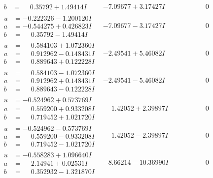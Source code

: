 \documentclass[1p]{elsarticle_modified}
\theoremstyle{definition}
\begin{document}
$$\begin{array}{c|c|c}
\begin{aligned}
b &= \phantom{-}0.35792 + 1.49414 I\end{aligned}
 & -7.09677 + 3.17427 I & \phantom{-0.000000 } 0 \\ \hline\begin{aligned}
u &= -0.222326 - 1.200120 I \\
a &= -0.544275 + 0.426823 I \\
b &= \phantom{-}0.35792 - 1.49414 I\end{aligned}
 & -7.09677 - 3.17427 I & \phantom{-0.000000 } 0 \\ \hline\begin{aligned}
u &= \phantom{-}0.584103 + 1.072360 I \\
a &= \phantom{-}0.912962 - 0.148431 I \\
b &= \phantom{-}0.889643 + 0.122228 I\end{aligned}
 & -2.49541 + 5.46082 I & \phantom{-0.000000 } 0 \\ \hline\begin{aligned}
u &= \phantom{-}0.584103 - 1.072360 I \\
a &= \phantom{-}0.912962 + 0.148431 I \\
b &= \phantom{-}0.889643 - 0.122228 I\end{aligned}
 & -2.49541 - 5.46082 I & \phantom{-0.000000 } 0 \\ \hline\begin{aligned}
u &= -0.524962 + 0.573769 I \\
a &= \phantom{-}0.559200 + 0.933208 I \\
b &= \phantom{-}0.719452 + 1.021720 I\end{aligned}
 & \phantom{-}1.42052 + 2.39897 I & \phantom{-0.000000 } 0 \\ \hline\begin{aligned}
u &= -0.524962 - 0.573769 I \\
a &= \phantom{-}0.559200 - 0.933208 I \\
b &= \phantom{-}0.719452 - 1.021720 I\end{aligned}
 & \phantom{-}1.42052 - 2.39897 I & \phantom{-0.000000 } 0 \\ \hline\begin{aligned}
u &= -0.558283 + 1.096640 I \\
a &= \phantom{-}2.14941 + 0.02531 I \\
b &= \phantom{-}0.352932 - 1.321870 I\end{aligned}
 & -8.66214 - 10.36990 I & \phantom{-0.000000 } 0 \\ \hline\begin{aligned}

\end{aligned}
\end{array}$$
\end{document}
